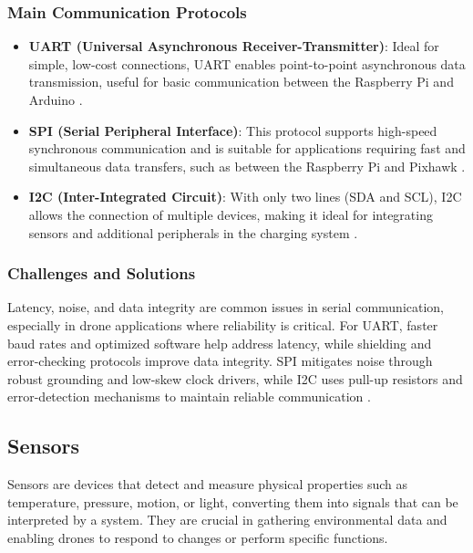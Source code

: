 \subsubsection{Main Communication Protocols}
\begin{itemize}
    \item \textbf{UART (Universal Asynchronous Receiver-Transmitter)}: Ideal for simple, low-cost connections, UART enables point-to-point asynchronous data transmission, useful for basic communication between the Raspberry Pi and Arduino \cite{Gupta2019}.
    \item \textbf{SPI (Serial Peripheral Interface)}: This protocol supports high-speed synchronous communication and is suitable for applications requiring fast and simultaneous data transfers, such as between the Raspberry Pi and Pixhawk \cite{Wootton2016}.
    \item \textbf{I2C (Inter-Integrated Circuit)}: With only two lines (SDA and SCL), I2C allows the connection of multiple devices, making it ideal for integrating sensors and additional peripherals in the charging system \cite{Gazi2021}.
\end{itemize}

\subsubsection{Challenges and Solutions}

Latency, noise, and data integrity are common issues in serial communication, especially in drone applications where reliability is critical. For UART, faster baud rates and optimized software help address latency, while shielding and error-checking protocols improve data integrity. SPI mitigates noise through robust grounding and low-skew clock drivers, while I2C uses pull-up resistors and error-detection mechanisms to maintain reliable communication \cite{CompComms2023}.

\subsection{Sensors}

Sensors are devices that detect and measure physical properties such as temperature, pressure, motion, or light, converting them into signals that can be interpreted by a system. They are crucial in gathering environmental data and enabling drones to respond to changes or perform specific functions.

